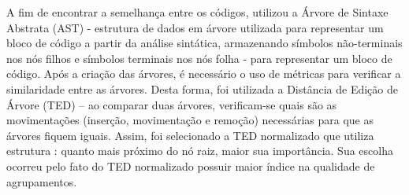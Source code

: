 	    A fim de encontrar a semelhança entre os códigos, 
	    utilizou a Árvore de Sintaxe Abstrata (AST) - estrutura de dados em árvore
	    utilizada para representar um bloco de código a partir da análise sintática,
	    armazenando símbolos não-terminais nos nós filhos e símbolos terminais nos
	    nós folha - para representar um bloco de código. Após a criação das árvores,
	    é necessário o uso de métricas para verificar a similaridade entre as árvores.
	    Desta forma, foi utilizada a Distância de Edição de Árvore (TED) – ao comparar
	    duas árvores, verificam-se quais são as movimentações (inserção, movimentação
	    e remoção) necessárias para que as árvores fiquem iguais. Assim, foi
	    selecionado a TED normalizado que utiliza estrutura :
	    quanto mais próximo do nó raiz, maior sua importância. Sua escolha ocorreu
	    pelo fato do TED normalizado possuir maior índice na qualidade de agrupamentos.
	    
